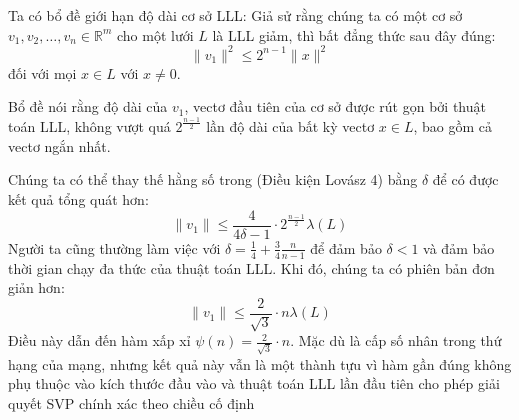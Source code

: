 \documentclass{article}
\begin{document}
Ta có  bổ đề  giới hạn độ dài cơ sở LLL:
Giả sử rằng chúng ta có một cơ sở \( v_1, v_2, \ldots, v_n \in \mathbb{R}^m \) cho một lưới \( L \) là LLL giảm, thì bất đẳng thức sau đây đúng:
\[ \|v_1\|^2 \leq 2^{n-1} \|x\|^2 \]
đối với mọi \( x \in L \) với \( x \neq 0 \).

 

Bổ đề nói rằng độ dài của $v_1$, vectơ đầu tiên của cơ sở được rút gọn bởi thuật toán LLL, không vượt quá $2^{\frac{n-1}{2}}$ lần độ dài của bất kỳ vectơ $x \in L$, bao gồm cả vectơ ngắn nhất. 



Chúng ta có thể thay thế hằng số trong (Điều kiện Lovász 4) bằng $\delta$ để có được kết quả tổng quát hơn:
\[
    \|v_1\| \leq \frac{4}{4\delta-1} \cdot 2^{\frac{n-1}{2}} \lambda(L)
\]
Người ta cũng thường làm việc với $\delta = \frac{1}{4} + \frac{3}{4}\frac{n}{n-1}$ để đảm bảo $\delta < 1$ và đảm bảo thời gian chạy đa thức của thuật toán LLL. Khi đó, chúng ta có phiên bản đơn giản hơn:
\[
    \|v_1\| \leq \frac{2}{\sqrt{3}} \cdot n \lambda(L)
\]
Điều này dẫn đến hàm xấp xỉ $\psi(n) = \frac{2}{\sqrt{3}} \cdot n$. Mặc dù là cấp số nhân trong thứ hạng của mạng, nhưng kết quả này vẫn là một thành tựu vì hàm gần đúng không phụ thuộc vào kích thước đầu vào và thuật toán LLL lần đầu tiên cho phép giải quyết SVP chính xác theo chiều cố định






\end{document}
